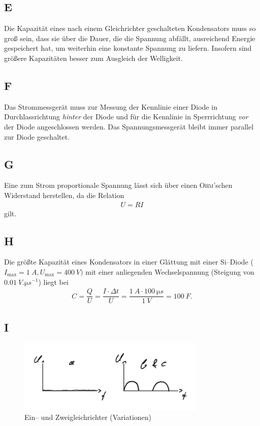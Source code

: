 \documentclass[a4paper,12pt]{article}
\numberwithin{equation}{section}
\begin{document}
\subsection{E}
Die Kapazität eines nach einem Gleichrichter geschalteten Kondensators muss so groß sein, dass sie über die Dauer, die die Spannung abfällt, ausreichend Energie gespeichert hat, um weiterhin eine konstante Spannung zu liefern.
Insofern sind größere Kapazitäten besser zum Ausgleich der Welligkeit.

\subsection{F}
Das Strommessgerät muss zur Messung der Kennlinie einer Diode in Durchlassrichtung \textit{hinter} der Diode und für die Kennlinie in Sperrrichtung \textit{vor} der Diode angeschlossen werden.
Das Spannungsmessgerät bleibt immer parallel zur Diode geschaltet.

\subsection{G}
Eine zum Strom proportionale Spannung lässt sich über einen \textsc{Ohm}'schen Widerstand herstellen, da die Relation
\begin{align} 
        U=RI
\end{align} 
gilt.

\subsection{H}
Die größte Kapazität eines Kondensators in einer Glättung mit einer Si--Diode ($I_{\text{max}}=\SI{1}{A}, U_{\text{max}}=\SI{400}{V})$ mit einer anliegenden Wechselspannung (Steigung von $\SI{0.01}{V.\micro s ^{-1}}$) liegt bei
\begin{align} 
        C=\dfrac{Q}{U}=\dfrac{I\cdot \Delta t}{U}=\dfrac{\SI{1}{A}\cdot \SI{100}{\micro s}}{\SI{1}{V}}=\SI{100}{F}
.\end{align} 

\subsection{I}
\begin{figure}[h]
        \centering
        \includegraphics[width=0.8\textwidth]{I_crop.pdf}
        \caption[Ein-- und Zweigleichrichter (Variationen)]{Ein-- und Zweigleichrichter (Variationen)}
\end{figure}
\end{document}
